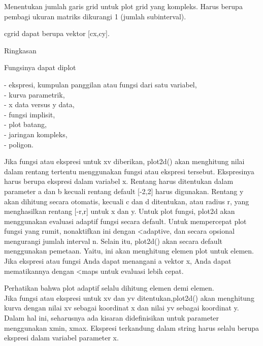 \documentclass[a4paper,10pt]{article}
\begin{document}
\begin{eulernotebook}
\begin{eulercomment}
\begin{eulercomment}
\begin{eulercomment}
\begin{eulercomment}
\begin{eulercomment}
\begin{eulercomment}
\begin{eulercomment}
\begin{eulercomment}
\begin{eulercomment}
\begin{eulercomment}
\begin{eulercomment}
\begin{eulercomment}
\begin{eulerttcomment}
 Menentukan jumlah garis grid untuk plot grid yang kompleks.
 Harus berupa pembagi ukuran matriks dikurangi 1 (jumlah subinterval).
\end{eulerttcomment}
\begin{eulercomment}
cgrid dapat berupa vektor [cx,cy].

Ringkasan

Fungsinya dapat diplot

- ekspresi, kumpulan panggilan atau fungsi dari satu variabel,\\
- kurva parametrik,\\
- x data versus y data,\\
- fungsi implisit,\\
- plot batang,\\
- jaringan kompleks,\\
- poligon.

Jika fungsi atau ekspresi untuk xv diberikan, plot2d() akan menghitung
nilai dalam rentang tertentu menggunakan fungsi atau ekspresi
tersebut. Ekspresinya harus berupa ekspresi dalam variabel x. Rentang
harus ditentukan dalam parameter a dan b kecuali rentang default
[-2,2] harus digunakan. Rentang y akan dihitung secara otomatis,
kecuali c dan d ditentukan, atau radius r, yang menghasilkan rentang
[-r,r] untuk x dan y. Untuk plot fungsi, plot2d akan menggunakan
evaluasi adaptif fungsi secara default. Untuk mempercepat plot fungsi
yang rumit, nonaktifkan ini dengan \textless{}adaptive, dan secara opsional
mengurangi jumlah interval n. Selain itu, plot2d() akan secara default
menggunakan pemetaan. Yaitu, ini akan menghitung elemen plot untuk
elemen. Jika ekspresi atau fungsi Anda dapat menangani a vektor x,
Anda dapat mematikannya dengan \textless{}maps untuk evaluasi lebih cepat.

Perhatikan bahwa plot adaptif selalu dihitung elemen demi elemen.\\
Jika fungsi atau ekspresi untuk xv dan yv ditentukan,plot2d() akan
menghitung kurva dengan nilai xv sebagai koordinat x dan nilai yv
sebagai koordinat y. Dalam hal ini, seharusnya ada kisaran
didefinisikan untuk parameter menggunakan xmin, xmax. Ekspresi
terkandung dalam string harus selalu berupa ekspresi dalam variabel
parameter x.



\end{eulercomment}
\end{eulercomment}
\end{eulercomment}
\end{eulercomment}
\end{eulercomment}
\end{eulercomment}
\end{eulercomment}
\end{eulercomment}
\end{eulercomment}
\end{eulercomment}
\end{eulercomment}
\end{eulercomment}
\end{eulercomment}
\end{eulernotebook}
\end{document}
